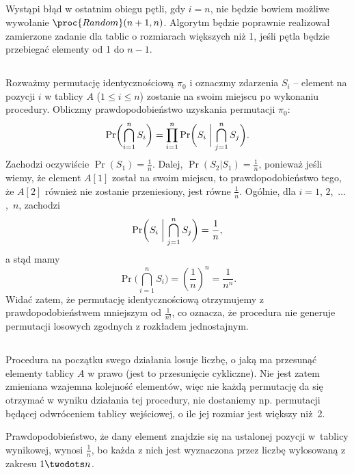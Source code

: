 \subsection{} %
Wystąpi błąd w ostatnim obiegu pętli, gdy $i=n$, nie będzie bowiem możliwe wywołanie $\proc{Random}(n+1,n)$. Algorytm będzie poprawnie realizował zamierzone zadanie dla tablic o rozmiarach większych niż 1, jeśli pętla będzie przebiegać elementy od 1 do $n-1$.

\subsection{} %
Rozważmy permutację identycznościową $\pi_0$ i oznaczmy zdarzenia $S_i$ -- element na pozycji $i$ w tablicy $A$ ($1\le i\le n$) zostanie na swoim miejscu po wykonaniu procedury. Obliczmy prawdopodobieństwo uzyskania permutacji $\pi_0$:
\[
	\Pr\biggl(\bigcap_{i=1}^nS_i\biggr) = \prod_{i=1}^n\Pr\biggl(S_i\biggm|\bigcap_{j=1}^nS_j\biggr).
\]
Zachodzi oczywiście $\Pr(S_1)=\frac{1}{n}$. Dalej, $\Pr(S_2|S_1)=\frac{1}{n}$, ponieważ jeśli wiemy, że element $A[1]$ został na swoim miejscu, to prawdopodobieństwo tego, że $A[2]$ również nie zostanie przeniesiony, jest równe $\frac{1}{n}$. Ogólnie, dla $i=1$, $2$,~$\dots$,~$n$, zachodzi
\[
	\Pr\biggl(S_i\biggm|\bigcap_{j=1}^nS_j\biggr) = \frac{1}{n},
\]
a stąd mamy
\[
	\Pr\biggl(\bigcap_{i=1}^nS_i\biggr) = \left(\frac{1}{n}\right)^n = \frac{1}{n^n}.
\]
Widać zatem, że permutację identycznościową otrzymujemy z prawdopodobieństwem mniejszym od $\frac{1}{n!}$, co oznacza, że procedura  nie generuje permutacji losowych zgodnych z rozkładem jednostajnym.

\subsection{} %
Procedura na początku swego działania losuje liczbę, o jaką ma przesunąć elementy tablicy $A$ w prawo (jest to przesunięcie cykliczne). Nie jest zatem zmieniana wzajemna kolejność elementów, więc nie każdą permutację da się otrzymać w wyniku działania tej procedury, nie dostaniemy np. permutacji będącej odwróceniem tablicy wejściowej, o ile jej rozmiar jest większy niż~2.

Prawdopodobieństwo, że dany element znajdzie się na ustalonej pozycji w~tablicy wynikowej, wynosi $\frac{1}{n}$, bo każda z nich jest wyznaczona przez liczbę wylosowaną z zakresu $1\twodots n$.

